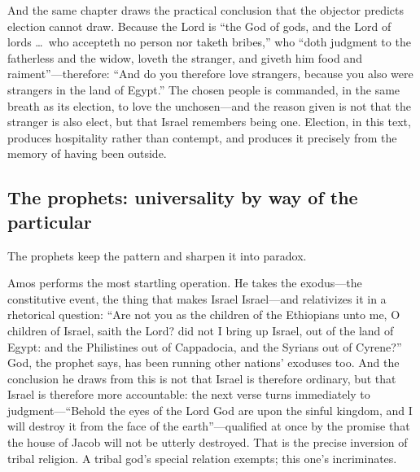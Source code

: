 And the same chapter draws the practical conclusion that the objector predicts election cannot draw. Because the Lord is ``the God of gods, and the Lord of lords \ldots\ who accepteth no person nor taketh bribes,'' who ``doth judgment to the fatherless and the widow, loveth the stranger, and giveth him food and raiment''---therefore: ``And do you therefore love strangers, because you also were strangers in the land of Egypt.'' The chosen people is commanded, in the same breath as its election, to love the unchosen---and the reason given is not that the stranger is also elect, but that Israel remembers being one. Election, in this text, produces hospitality rather than contempt, and produces it precisely from the memory of having been outside.

\subsection{The prophets: universality by way of the particular}

The prophets keep the pattern and sharpen it into paradox.

Amos performs the most startling operation. He takes the exodus---the constitutive event, the thing that makes Israel Israel---and relativizes it in a rhetorical question: ``Are not you as the children of the Ethiopians unto me, O children of Israel, saith the Lord? did not I bring up Israel, out of the land of Egypt: and the Philistines out of Cappadocia, and the Syrians out of Cyrene?'' God, the prophet says, has been running other nations' exoduses too. And the conclusion he draws from this is not that Israel is therefore ordinary, but that Israel is therefore more accountable: the next verse turns immediately to judgment---``Behold the eyes of the Lord God are upon the sinful kingdom, and I will destroy it from the face of the earth''---qualified at once by the promise that the house of Jacob will not be utterly destroyed. That is the precise inversion of tribal religion. A tribal god's special relation exempts; this one's incriminates.

